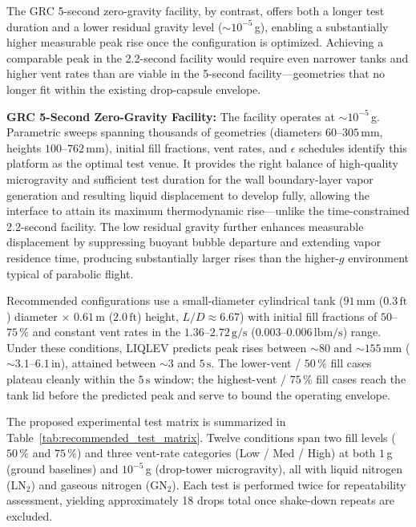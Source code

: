 \documentclass[conf]{new-aiaa}
\begin{document}
The GRC 5-second zero-gravity facility, by contrast, offers both a longer test duration and a lower residual gravity level ($\sim 10^{-5}\,$g), enabling a substantially higher measurable peak rise once the configuration is optimized. Achieving a comparable peak in the 2.2-second facility would require even narrower tanks and higher vent rates than are viable in the 5-second facility---geometries that no longer fit within the existing drop-capsule envelope.

\textbf{GRC 5-Second Zero-Gravity Facility:}
The facility operates at $\sim 10^{-5}\,$g. Parametric sweeps spanning thousands of geometries (diameters $60$--$305\,\text{mm}$, heights $100$--$762\,\text{mm}$), initial fill fractions, vent rates, and $\epsilon$ schedules identify this platform as the optimal test venue. It provides the right balance of high-quality microgravity and sufficient test duration for the wall boundary-layer vapor generation and resulting liquid displacement to develop fully, allowing the interface to attain its maximum thermodynamic rise---unlike the time-constrained 2.2-second facility. The low residual gravity further enhances measurable displacement by suppressing buoyant bubble departure and extending vapor residence time, producing substantially larger rises than the higher-$g$ environment typical of parabolic flight.

Recommended configurations use a small-diameter cylindrical tank ($91\,\text{mm}$ ($0.3\,\text{ft}$) diameter $\times$ $0.61\,\text{m}$ ($2.0\,\text{ft}$) height, $L/D \approx 6.67$) with initial fill fractions of $50$--$75\,\%$ and constant vent rates in the $1.36$--$2.72\,\text{g/s}$ ($0.003$--$0.006\,\text{lbm/s}$) range. Under these conditions, LIQLEV predicts peak rises between $\sim 80$ and $\sim 155\,\text{mm}$ ($\sim 3.1$--$6.1\,\text{in}$), attained between $\sim 3$ and $5\,\text{s}$. The lower-vent / $50\,\%$ fill cases plateau cleanly within the $5\,\text{s}$ window; the highest-vent / $75\,\%$ fill cases reach the tank lid before the predicted peak and serve to bound the operating envelope.

The proposed experimental test matrix is summarized in Table~\ref{tab:recommended_test_matrix}. Twelve conditions span two fill levels ($50\,\%$ and $75\,\%$) and three vent-rate categories (Low / Med / High) at both $1\,$g (ground baselines) and $10^{-5}\,$g (drop-tower microgravity), all with liquid nitrogen (LN$_2$) and gaseous nitrogen (GN$_2$). Each test is performed twice for repeatability assessment, yielding approximately 18 drops total once shake-down repeats are excluded.
\end{document}
